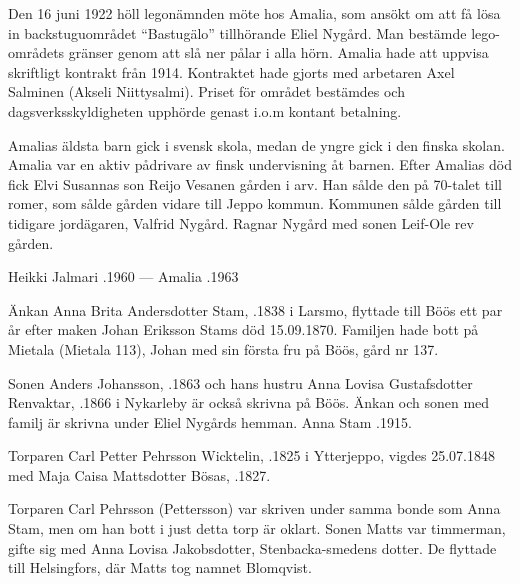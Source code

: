 Den 16 juni 1922 höll legonämnden möte hos Amalia, som ansökt om att få lösa in backstuguområdet ``Bastugälo'' tillhörande Eliel Nygård. Man bestämde lego-områdets gränser genom att slå ner pålar i alla hörn. Amalia hade att uppvisa skriftligt kontrakt från 1914. Kontraktet hade gjorts med arbetaren Axel Salminen (Akseli Niittysalmi). Priset för området bestämdes och dagsverksskyldigheten upphörde genast i.o.m kontant betalning.

Amalias äldsta barn gick i svensk skola, medan de yngre gick i den finska skolan. Amalia var en aktiv pådrivare av finsk undervisning åt barnen. Efter Amalias död fick Elvi Susannas son Reijo Vesanen gården i arv. Han sålde den på 70-talet till romer, som sålde gården vidare till Jeppo kommun. Kommunen sålde gården till tidigare jordägaren, Valfrid Nygård. Ragnar Nygård med sonen Leif-Ole rev gården.

Heikki Jalmari .1960  ---  Amalia .1963


Änkan Anna Brita Andersdotter Stam, .1838 i Larsmo, flyttade till Böös ett par år efter maken Johan Eriksson Stams död 15.09.1870. Familjen hade bott på Mietala (Mietala 113), Johan med sin första fru på Böös, gård nr 137.

Sonen Anders Johansson, .1863 och hans hustru Anna Lovisa Gustafsdotter Renvaktar, .1866 i Nykarleby är också skrivna på Böös. Änkan och sonen med familj är skrivna under Eliel Nygårds hemman. Anna Stam .1915.


Torparen Carl Petter Pehrsson Wicktelin, .1825 i Ytterjeppo, vigdes 25.07.1848 med Maja Caisa Mattsdotter Bösas, .1827.
\begin{jhchildren}
  \item {}
  \item {}
  \item {}
  \item {}
  \item {}
  \item {}
\end{jhchildren}
Torparen Carl Pehrsson (Pettersson) var skriven under samma bonde som Anna Stam, men om han bott i just detta torp är oklart. Sonen Matts var timmerman, gifte sig med Anna Lovisa Jakobsdotter, Stenbacka-smedens dotter. De flyttade till Helsingfors, där Matts tog namnet Blomqvist.



